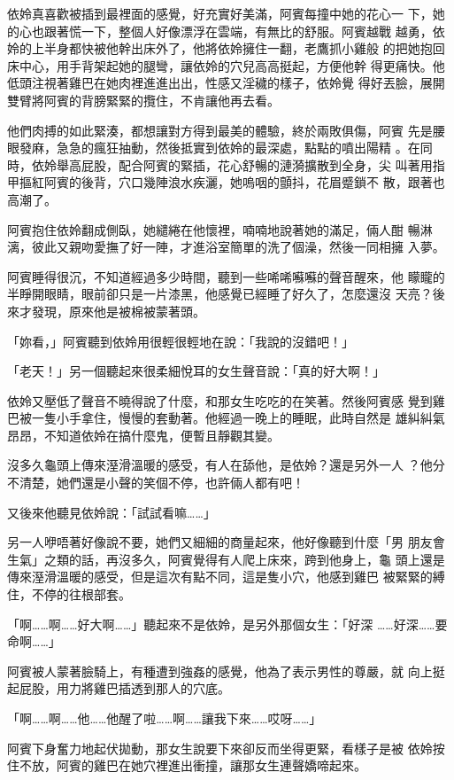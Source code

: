依姈真喜歡被插到最裡面的感覺，好充實好美滿，阿賓每撞中她的花心一
下，她的心也跟著慌一下，整個人好像漂浮在雲端，有無比的舒服。阿賓越戰
越勇，依姈的上半身都快被他幹出床外了，他將依姈擁住一翻，老鷹抓小雞般
的把她抱回床中心，用手背架起她的腿彎，讓依姈的穴兒高高挺起，方便他幹
得更痛快。他低頭注視著雞巴在她肉裡進進出出，性感又淫穢的樣子，依姈覺
得好丟臉，展開雙臂將阿賓的背膀緊緊的攬住，不肯讓他再去看。

他們肉搏的如此緊湊，都想讓對方得到最美的體驗，終於兩敗俱傷，阿賓
先是腰眼發麻，急急的瘋狂抽動，然後抵實到依姈的最深處，點點的噴出陽精
。在同時，依姈舉高屁股，配合阿賓的緊插，花心舒暢的漣漪擴散到全身，尖
叫著用指甲摳紅阿賓的後背，穴口幾陣浪水疾灑，她嗚咽的顫抖，花眉蹙鎖不
散，跟著也高潮了。

阿賓抱住依姈翻成側臥，她繾綣在他懷裡，喃喃地說著她的滿足，倆人酣
暢淋漓，彼此又親吻愛撫了好一陣，才進浴室簡單的洗了個澡，然後一同相擁
入夢。

阿賓睡得很沉，不知道經過多少時間，聽到一些唏唏囌囌的聲音醒來，他
矇矓的半睜開眼睛，眼前卻只是一片漆黑，他感覺已經睡了好久了，怎麼還沒
天亮？後來才發現，原來他是被棉被蒙著頭。

「妳看，」阿賓聽到依姈用很輕很輕地在說：「我說的沒錯吧！」

「老天！」另一個聽起來很柔細悅耳的女生聲音說：「真的好大啊！」

依姈又壓低了聲音不曉得說了什麼，和那女生吃吃的在笑著。然後阿賓感
覺到雞巴被一隻小手拿住，慢慢的套動著。他經過一晚上的睡眠，此時自然是
雄糾糾氣昂昂，不知道依姈在搞什麼鬼，便暫且靜觀其變。

沒多久龜頭上傳來溼滑溫暖的感受，有人在舔他，是依姈？還是另外一人
？他分不清楚，她們還是小聲的笑個不停，也許倆人都有吧！

又後來他聽見依姈說：「試試看嘛……」

另一人咿唔著好像說不要，她們又細細的商量起來，他好像聽到什麼「男
朋友會生氣」之類的話，再沒多久，阿賓覺得有人爬上床來，跨到他身上，龜
頭上還是傳來溼滑溫暖的感受，但是這次有點不同，這是隻小穴，他感到雞巴
被緊緊的縛住，不停的往根部套。

「啊……啊……好大啊……」聽起來不是依姈，是另外那個女生：「好深
……好深……要命啊……」

阿賓被人蒙著臉騎上，有種遭到強姦的感覺，他為了表示男性的尊嚴，就
向上挺起屁股，用力將雞巴插透到那人的穴底。

「啊……啊……他……他醒了啦……啊……讓我下來……哎呀……」

阿賓下身奮力地起伏拋動，那女生說要下來卻反而坐得更緊，看樣子是被
依姈按住不放，阿賓的雞巴在她穴裡進出衝撞，讓那女生連聲嬌啼起來。

